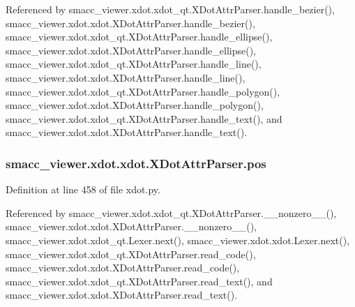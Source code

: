 Referenced by smacc\+\_\+viewer.\+xdot.\+xdot\+\_\+qt.\+X\+Dot\+Attr\+Parser.\+handle\+\_\+bezier(), smacc\+\_\+viewer.\+xdot.\+xdot.\+X\+Dot\+Attr\+Parser.\+handle\+\_\+bezier(), smacc\+\_\+viewer.\+xdot.\+xdot\+\_\+qt.\+X\+Dot\+Attr\+Parser.\+handle\+\_\+ellipse(), smacc\+\_\+viewer.\+xdot.\+xdot.\+X\+Dot\+Attr\+Parser.\+handle\+\_\+ellipse(), smacc\+\_\+viewer.\+xdot.\+xdot\+\_\+qt.\+X\+Dot\+Attr\+Parser.\+handle\+\_\+line(), smacc\+\_\+viewer.\+xdot.\+xdot.\+X\+Dot\+Attr\+Parser.\+handle\+\_\+line(), smacc\+\_\+viewer.\+xdot.\+xdot\+\_\+qt.\+X\+Dot\+Attr\+Parser.\+handle\+\_\+polygon(), smacc\+\_\+viewer.\+xdot.\+xdot.\+X\+Dot\+Attr\+Parser.\+handle\+\_\+polygon(), smacc\+\_\+viewer.\+xdot.\+xdot\+\_\+qt.\+X\+Dot\+Attr\+Parser.\+handle\+\_\+text(), and smacc\+\_\+viewer.\+xdot.\+xdot.\+X\+Dot\+Attr\+Parser.\+handle\+\_\+text().

\subsubsection[{\texorpdfstring{pos}{pos}}]{\setlength{\rightskip}{0pt plus 5cm}smacc\+\_\+viewer.\+xdot.\+xdot.\+X\+Dot\+Attr\+Parser.\+pos}\hypertarget{classsmacc__viewer_1_1xdot_1_1xdot_1_1XDotAttrParser_a4e3d002256eadbd59bda22fc62660cf6}{}\label{classsmacc__viewer_1_1xdot_1_1xdot_1_1XDotAttrParser_a4e3d002256eadbd59bda22fc62660cf6}


Definition at line 458 of file xdot.\+py.



Referenced by smacc\+\_\+viewer.\+xdot.\+xdot\+\_\+qt.\+X\+Dot\+Attr\+Parser.\+\_\+\+\_\+nonzero\+\_\+\+\_\+(), smacc\+\_\+viewer.\+xdot.\+xdot.\+X\+Dot\+Attr\+Parser.\+\_\+\+\_\+nonzero\+\_\+\+\_\+(), smacc\+\_\+viewer.\+xdot.\+xdot\+\_\+qt.\+Lexer.\+next(), smacc\+\_\+viewer.\+xdot.\+xdot.\+Lexer.\+next(), smacc\+\_\+viewer.\+xdot.\+xdot\+\_\+qt.\+X\+Dot\+Attr\+Parser.\+read\+\_\+code(), smacc\+\_\+viewer.\+xdot.\+xdot.\+X\+Dot\+Attr\+Parser.\+read\+\_\+code(), smacc\+\_\+viewer.\+xdot.\+xdot\+\_\+qt.\+X\+Dot\+Attr\+Parser.\+read\+\_\+text(), and smacc\+\_\+viewer.\+xdot.\+xdot.\+X\+Dot\+Attr\+Parser.\+read\+\_\+text().

